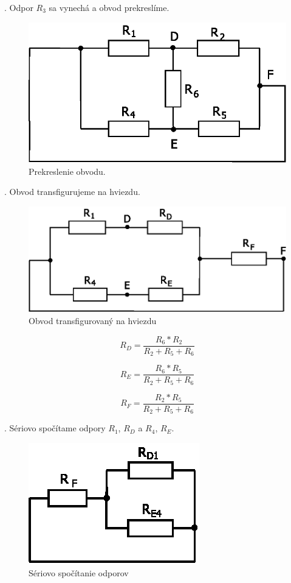 \documentclass[a4paper,12pt]{article}
\begin{document}
. Odpor $R_3$ sa vynechá a obvod prekreslíme.
\begin{figure}[!htb]
\centering
\includegraphics[scale=1.5]{p2/p1.eps}
\caption{Prekreslenie obvodu.}
\end{figure}

. Obvod transfigurujeme na hviezdu.
\begin{figure}[!htb]
\centering
\includegraphics[scale=1.5]{p2/p2.eps}
\caption{Obvod transfigurovaný na hviezdu}
\end{figure}

\begin{equation}
R_D = \frac{R_6 * R_2}{R_2 + R_5 + R_6}
\end{equation}

\begin{equation}
R_E = \frac{R_6 * R_5}{R_2 + R_5 + R_6}
\end{equation}

\begin{equation}
R_F = \frac{R_2 * R_5}{R_2 + R_5 + R_6}
\end{equation}

. Sériovo spočítame odpory $R_1$, $R_D$ a $R_4$, $R_E$.
\begin{figure}[!htb]
\centering
\includegraphics[scale=1.5]{p2/p3.eps}
\caption{Sériovo spočítanie odporov}
\end{figure}
\end{document}

